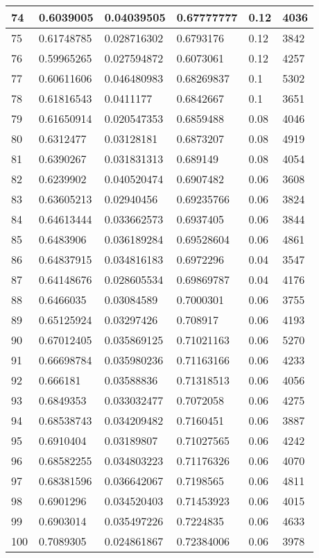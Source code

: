 \begin{longtable}{|l|l|l|l|l|l|}
74 & 0.6039005 & 0.04039505 & 0.67777777 & 0.12 & 4036 \\ \hline 
75 & 0.61748785 & 0.028716302 & 0.6793176 & 0.12 & 3842 \\ \hline 
76 & 0.59965265 & 0.027594872 & 0.6073061 & 0.12 & 4257 \\ \hline 
77 & 0.60611606 & 0.046480983 & 0.68269837 & 0.1 & 5302 \\ \hline 
78 & 0.61816543 & 0.0411177 & 0.6842667 & 0.1 & 3651 \\ \hline 
79 & 0.61650914 & 0.020547353 & 0.6859488 & 0.08 & 4046 \\ \hline 
80 & 0.6312477 & 0.03128181 & 0.6873207 & 0.08 & 4919 \\ \hline 
81 & 0.6390267 & 0.031831313 & 0.689149 & 0.08 & 4054 \\ \hline 
82 & 0.6239902 & 0.040520474 & 0.6907482 & 0.06 & 3608 \\ \hline 
83 & 0.63605213 & 0.02940456 & 0.69235766 & 0.06 & 3824 \\ \hline 
84 & 0.64613444 & 0.033662573 & 0.6937405 & 0.06 & 3844 \\ \hline 
85 & 0.6483906 & 0.036189284 & 0.69528604 & 0.06 & 4861 \\ \hline 
86 & 0.64837915 & 0.034816183 & 0.6972296 & 0.04 & 3547 \\ \hline 
87 & 0.64148676 & 0.028605534 & 0.69869787 & 0.04 & 4176 \\ \hline 
88 & 0.6466035 & 0.03084589 & 0.7000301 & 0.06 & 3755 \\ \hline 
89 & 0.65125924 & 0.03297426 & 0.708917 & 0.06 & 4193 \\ \hline 
90 & 0.67012405 & 0.035869125 & 0.71021163 & 0.06 & 5270 \\ \hline 
91 & 0.66698784 & 0.035980236 & 0.71163166 & 0.06 & 4233 \\ \hline 
92 & 0.666181 & 0.03588836 & 0.71318513 & 0.06 & 4056 \\ \hline 
93 & 0.6849353 & 0.033032477 & 0.7072058 & 0.06 & 4275 \\ \hline 
94 & 0.68538743 & 0.034209482 & 0.7160451 & 0.06 & 3887 \\ \hline 
95 & 0.6910404 & 0.03189807 & 0.71027565 & 0.06 & 4242 \\ \hline 
96 & 0.68582255 & 0.034803223 & 0.71176326 & 0.06 & 4070 \\ \hline 
97 & 0.68381596 & 0.036642067 & 0.7198565 & 0.06 & 4811 \\ \hline 
98 & 0.6901296 & 0.034520403 & 0.71453923 & 0.06 & 4015 \\ \hline 
99 & 0.6903014 & 0.035497226 & 0.7224835 & 0.06 & 4633 \\ \hline 
100 & 0.7089305 & 0.024861867 & 0.72384006 & 0.06 & 3978 \\ \hline 
\end{longtable}